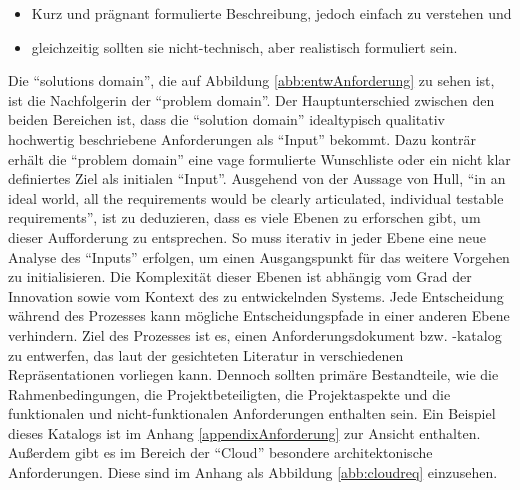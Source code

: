 \begin{itemize}
	\item Kurz und prägnant formulierte Beschreibung, jedoch einfach zu verstehen und
	\item gleichzeitig sollten sie nicht-technisch, aber realistisch formuliert sein.
\end{itemize}
 
 Die \enquote{solutions domain}, die auf Abbildung \vref{abb:entwAnforderung} zu sehen ist, ist die Nachfolgerin der \enquote{problem domain}. Der Hauptunterschied zwischen den beiden Bereichen ist, dass die \enquote{solution domain} idealtypisch qualitativ hochwertig beschriebene Anforderungen als \enquote{Input} bekommt. Dazu konträr erhält die \enquote{problem domain} eine vage formulierte Wunschliste oder ein nicht klar definiertes Ziel als initialen \enquote{Input}. Ausgehend von der Aussage von Hull, \enquote{in an ideal world, all the requirements would be clearly articulated, individual testable requirements}\autocite[][S.\,115]{hull_requirements_2011}, ist zu deduzieren, dass es viele Ebenen zu erforschen gibt, um dieser Aufforderung zu entsprechen. So muss iterativ in jeder Ebene eine neue Analyse des \enquote{Inputs} erfolgen, um einen Ausgangspunkt für das weitere Vorgehen zu initialisieren. Die Komplexität dieser Ebenen ist abhängig vom Grad der Innovation sowie vom Kontext des zu entwickelnden Systems. Jede Entscheidung während des Prozesses kann mögliche Entscheidungspfade in einer anderen Ebene verhindern. Ziel des Prozesses ist es, einen Anforderungsdokument bzw. -katalog zu entwerfen, das laut der gesichteten Literatur in verschiedenen Repräsentationen vorliegen kann. Dennoch sollten primäre Bestandteile, wie die Rahmenbedingungen, die Projektbeteiligten, die Projektaspekte und die funktionalen und nicht-funktionalen Anforderungen enthalten sein. Ein Beispiel dieses Katalogs ist im Anhang \vref{appendixAnforderung} zur Ansicht enthalten. Außerdem gibt es im Bereich der \enquote{Cloud} besondere architektonische Anforderungen. Diese sind im Anhang als Abbildung \vref{abb:cloudreq} einzusehen.
 

